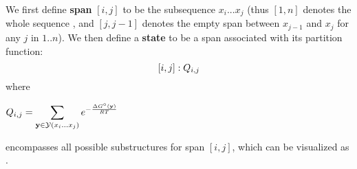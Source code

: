 
We first define {\bf span} $[i,j]$ to be the subsequence $x_i ... x_j$
(thus $[1,n]$ denotes the whole sequence \vecx, and $[j, j\!-\!1]$ denotes the empty span between $x_{j-1}$ and $x_j$ for any $j$ in $1..n$).
We then define a {\bf state} to be a span associated with its partition function:\\[-0.4cm] %
\[
  [i,j]: Q_{{{i}}, {{j}}}
\]
where %
\begin{center}
  \vspace{-0.6cm}
  $\displaystyle Q_{{{i}}, {{j}}} = \sum_{\mathbf{y} \in \mathcal{Y}(x_i ... x_j)} e ^{-\frac{\Delta G^{\circ}(\mathbf{y})}{RT}}$
  \vspace{-0.1cm}
\end{center}
encompasses all possible substructures for span $[i, j]$, %
which can be visualized as
.



